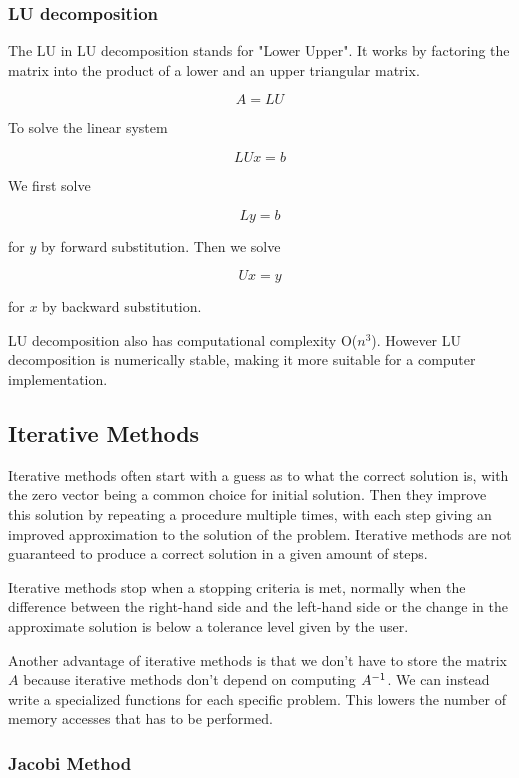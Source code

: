 \subsubsection*{LU decomposition}

The LU in LU decomposition stands for "Lower Upper". It works by factoring the 
matrix into the product of a lower and an upper triangular matrix. 

$$A = LU$$

To solve the linear system 

$$LUx = b$$

We first solve 

$$Ly = b$$

for $y$ by forward substitution. Then we solve 

$$Ux = y$$

for $x$ by backward substitution.

LU decomposition also has computational complexity O($n^3$). However LU decomposition 
is numerically stable, making it more suitable for a computer implementation.

\subsection*{Iterative Methods}

Iterative methods often start with a guess as to what the correct solution is, 
with the zero vector being a common choice for initial solution. Then they improve 
this solution by repeating a procedure multiple times, with each step 
giving an improved approximation to the solution of the problem. Iterative methods 
are not guaranteed to produce a correct solution in a given amount of steps. 

Iterative methods stop when a stopping criteria is met, normally when the difference 
between the right-hand side and the left-hand side or the change in the approximate 
solution is below a tolerance level given by the user. 

Another advantage of iterative methods is that we don't have to store the matrix 
$A$ because iterative methods don't depend on computing ${A}^{-1}$. We can instead 
write a specialized functions for each specific problem. This lowers the number of 
memory accesses that has to be performed. 

\subsubsection*{Jacobi Method}

